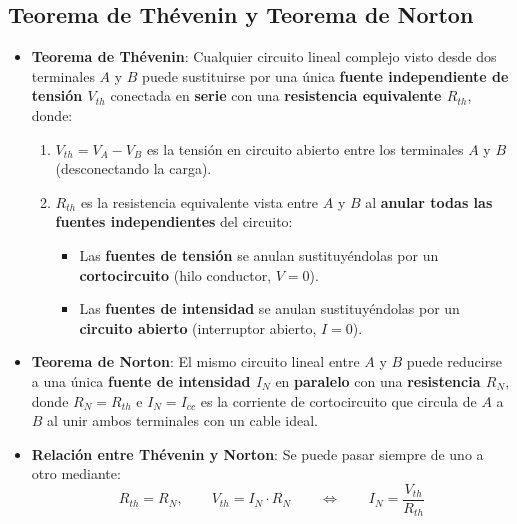 \subsection{Teorema de Thévenin y Teorema de Norton}

\begin{ley}
\begin{itemize}
    \item \textbf{Teorema de Thévenin}: Cualquier circuito lineal complejo visto desde dos terminales $A$ y $B$ puede sustituirse por una única \textbf{fuente independiente de tensión $V_{th}$} conectada en \textbf{serie} con una \textbf{resistencia equivalente $R_{th}$}, donde:
    \begin{enumerate}
        \item $V_{th} = V_A - V_B$ es la tensión en circuito abierto entre los terminales $A$ y $B$ (desconectando la carga).
        \item $R_{th}$ es la resistencia equivalente vista entre $A$ y $B$ al \textbf{anular todas las fuentes independientes} del circuito:
        \begin{itemize}
            \item Las \textbf{fuentes de tensión} se anulan sustituyéndolas por un \textbf{cortocircuito} (hilo conductor, $V=0$).
            \item Las \textbf{fuentes de intensidad} se anulan sustituyéndolas por un \textbf{circuito abierto} (interruptor abierto, $I=0$).
        \end{itemize}
    \end{enumerate}
    \item \textbf{Teorema de Norton}: El mismo circuito lineal entre $A$ y $B$ puede reducirse a una única \textbf{fuente de intensidad $I_N$} en \textbf{paralelo} con una \textbf{resistencia $R_N$}, donde $R_N = R_{th}$ e $I_N = I_{cc}$ es la corriente de cortocircuito que circula de $A$ a $B$ al unir ambos terminales con un cable ideal.
    \item \textbf{Relación entre Thévenin y Norton}: Se puede pasar siempre de uno a otro mediante:
    \begin{equation}
        R_{th} = R_N, \qquad V_{th} = I_N \cdot R_N \qquad \Longleftrightarrow \qquad I_N = \frac{V_{th}}{R_{th}}
    \end{equation}
\end{itemize}
\end{ley}

